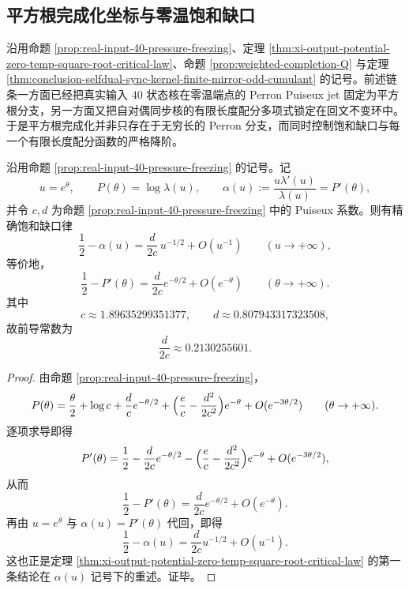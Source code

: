 \subsection{平方根完成化坐标与零温饱和缺口}\label{subsec:conclusion-squareroot-saturation-completed-coordinate}
沿用命题 \ref{prop:real-input-40-pressure-freezing}、定理 \ref{thm:xi-output-potential-zero-temp-square-root-critical-law}、命题 \ref{prop:weighted-completion-Q} 与定理 \ref{thm:conclusion-selfdual-sync-kernel-finite-mirror-odd-cumulant} 的记号。前述链条一方面已经把真实输入 \(40\) 状态核在零温端点的 Perron Puiseux jet 固定为平方根分支，另一方面又把自对偶同步核的有限长度配分多项式锁定在回文不变环中。于是平方根完成化并非只存在于无穷长的 Perron 分支，而同时控制饱和缺口与每一个有限长度配分函数的严格降阶。

\begin{theorem}\label{thm:conclusion-realinput40-saturation-gap-halfpower}
沿用命题 \ref{prop:real-input-40-pressure-freezing} 的记号。记
\[
u=e^\theta,
\qquad
P(\theta)=\log\lambda(u),
\qquad
\alpha(u):=\frac{u\lambda'(u)}{\lambda(u)}=P'(\theta),
\]
并令 \(c,d\) 为命题 \ref{prop:real-input-40-pressure-freezing} 中的 Puiseux 系数。则有精确饱和缺口律
\[
\frac12-\alpha(u)=\frac{d}{2c}\,u^{-1/2}+O(u^{-1})
\qquad (u\to+\infty),
\]
等价地，
\[
\frac12-P'(\theta)=\frac{d}{2c}e^{-\theta/2}+O(e^{-\theta})
\qquad (\theta\to+\infty).
\]
其中
\[
c\approx 1.89635299351377,
\qquad
d\approx 0.807943317323508,
\]
故前导常数为
\[
\frac{d}{2c}\approx 0.2130255601.
\]
\end{theorem}
\begin{proof}
由命题 \ref{prop:real-input-40-pressure-freezing}，
\[
P(\theta)
=
\frac{\theta}{2}+\log c+\frac{d}{c}e^{-\theta/2}
+\Bigl(\frac{e}{c}-\frac{d^2}{2c^2}\Bigr)e^{-\theta}
+O(e^{-3\theta/2})
\qquad (\theta\to+\infty).
\]
逐项求导即得
\[
P'(\theta)
=
\frac12-\frac{d}{2c}e^{-\theta/2}
-\Bigl(\frac{e}{c}-\frac{d^2}{2c^2}\Bigr)e^{-\theta}
+O(e^{-3\theta/2}),
\]
从而
\[
\frac12-P'(\theta)=\frac{d}{2c}e^{-\theta/2}+O(e^{-\theta}).
\]
再由 \(u=e^\theta\) 与 \(\alpha(u)=P'(\theta)\) 代回，即得
\[
\frac12-\alpha(u)=\frac{d}{2c}u^{-1/2}+O(u^{-1}).
\]
这也正是定理 \ref{thm:xi-output-potential-zero-temp-square-root-critical-law} 的第一条结论在 \(\alpha(u)\) 记号下的重述。证毕。
\end{proof}

